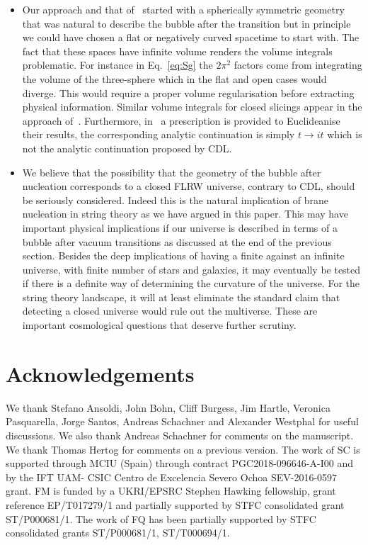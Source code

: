 \documentclass[a4paper,11pt]{article}
\numberwithin{equation}{section}
\begin{document}
\begin{itemize}
\item Our approach and that of~\cite{Fischler:1989se,Fischler:1990pk}  started with a spherically symmetric geometry that was natural  to describe the bubble after the transition but in principle we could have chosen a flat or negatively curved spacetime to start with. The fact that these spaces have infinite volume renders  the volume integrals problematic. For instance in Eq.~\eqref{eq:Sg} the $2\pi^2$ factors come from integrating the volume of the three-sphere  which in the flat and open cases would diverge. This would require a proper volume regularisation before extracting physical information. Similar volume integrals for closed slicings appear in the approach of~\cite{Fischler:1989se,Fischler:1990pk}. Furthermore, in~\cite{Fischler:1989se,Fischler:1990pk} a prescription is provided to Euclideanise their results, the corresponding analytic continuation is simply $t\rightarrow it$ which is not the analytic continuation proposed by CDL. 

\item We believe that  the possibility that the geometry of the bubble after nucleation corresponds to a closed FLRW universe, contrary to CDL,  should be  seriously considered. Indeed this is the natural implication of brane nucleation in string theory as we have argued in this paper. This may have important physical implications if our universe is described in terms of a bubble after vacuum transitions as discussed at the end of the previous section. Besides the deep implications of having a finite against an infinite universe, with finite number of stars and galaxies, it may eventually be tested if there is a definite way of determining the curvature of the universe. For the string theory landscape, it will at least eliminate the standard claim that detecting a closed universe would rule out the multiverse. These are important cosmological questions that deserve further scrutiny.
 
 \end{itemize}
 


\section*{Acknowledgements}
We thank Stefano Ansoldi, John Bohn, Cliff Burgess,  Jim Hartle,  Veronica Pasquarella,  Jorge Santos, Andreas Schachner and Alexander Westphal for useful discussions. We also thank Andreas Schachner for  comments on the manuscript. We thank Thomas Hertog for comments on a previous version. The work of SC is supported through MCIU (Spain) through contract PGC2018-096646-A-I00 and by the IFT UAM- CSIC Centro de Excelencia Severo Ochoa SEV-2016-0597 grant. FM is funded by a UKRI/EPSRC Stephen Hawking fellowship, grant reference EP/T017279/1 and partially supported by STFC consolidated grant ST/P000681/1. The work of FQ has been partially supported by STFC consolidated grants ST/P000681/1, ST/T000694/1.
\appendix
\end{document}
